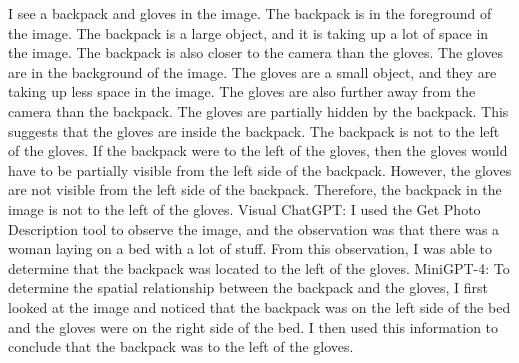 \begin{enumerate}
    I see a backpack and gloves in the image.
    The backpack is in the foreground of the image. The backpack is a large object, and it is taking up a lot of space in the image. The backpack is also closer to the camera than the gloves.
    The gloves are in the background of the image. The gloves are a small object, and they are taking up less space in the image. The gloves are also further away from the camera than the backpack.
    The gloves are partially hidden by the backpack. This suggests that the gloves are inside the backpack.
    The backpack is not to the left of the gloves. If the backpack were to the left of the gloves, then the gloves would have to be partially visible from the left side of the backpack. However, the gloves are not visible from the left side of the backpack.
    Therefore, the backpack in the image is not to the left of the gloves.
    \subitem Visual ChatGPT: I used the Get Photo Description tool to observe the image, and the observation was that there was a woman laying on a bed with a lot of stuff. From this observation, I was able to determine that the backpack was located to the left of the gloves.
    \subitem MiniGPT-4: To determine the spatial relationship between the backpack and the gloves, I first looked at the image and noticed that the backpack was on the left side of the bed and the gloves were on the right side of the bed. I then used this information to conclude that the backpack was to the left of the gloves.
\end{enumerate}
